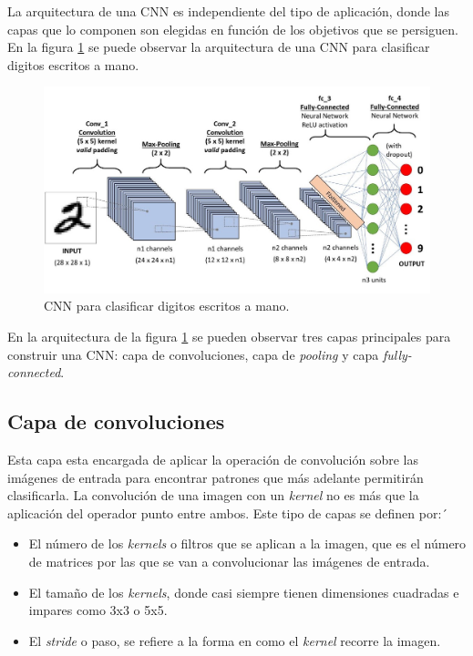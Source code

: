 La arquitectura de una CNN es independiente del tipo de aplicación, donde las capas que lo componen son elegidas en función de los objetivos que se persiguen. En la figura \ref{fig:cnn_arch} se puede observar la arquitectura de una CNN para clasificar digitos escritos a mano.

\begin{figure}[h]
	\centering
	\includegraphics[scale=0.35]{./Figures/cnn_arch.jpeg}
	\caption{CNN para clasificar digitos escritos a mano.}
	\label{fig:cnn_arch}
\end{figure}

En la arquitectura de la figura \ref{fig:cnn_arch} se pueden observar tres capas principales para construir una CNN: capa de convoluciones, capa de \textit{pooling} y capa \textit{fully-connected}.

\subsection{Capa de convoluciones}
Esta capa esta encargada de aplicar la operación de convolución sobre las imágenes de entrada para encontrar patrones que más adelante permitirán clasificarla. La convolución de una imagen con un \textit{kernel} no es más que la aplicación del operador punto entre ambos. Este tipo de capas se definen por:´
\begin{itemize}
	\item El número de los \textit{kernels} o filtros que se aplican a la imagen, que es el número de matrices por las que se van a convolucionar las imágenes de entrada.
	\item El tamaño de los \textit{kernels}, donde casi siempre tienen dimensiones cuadradas e impares como 3x3 o 5x5.
	\item El \textit{stride} o paso, se refiere a la forma en como el \textit{kernel} recorre la imagen.
\end{itemize}

